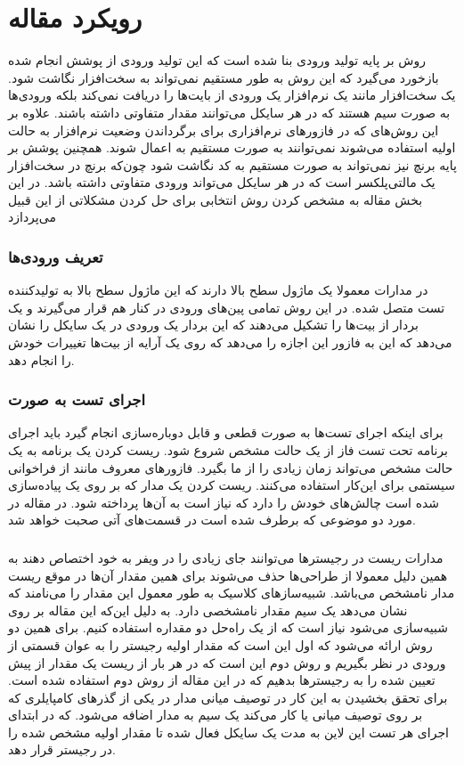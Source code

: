 \documentclass[conference]{IEEEtran}
\begin{document}
\section{رویکرد مقاله
}
روش
بر پایه تولید ورودی بنا شده است که این تولید ورودی از پوشش انجام شده بازخورد می‌گیرد که این
روش به طور مستقیم نمی‌تواند به سخت‌افزار نگاشت شود.
یک سخت‌افزار مانند یک نرم‌افزار یک ورودی از بایت‌ها را دریافت نمی‌کند بلکه ورودی‌ها به صورت
سیم هستند که در هر سایکل می‌توانند مقدار متفاوتی داشته باشند.
علاوه‌ بر این روش‌های
که در فازور‌های نرم‌افزاری برای برگرداندن وضعیت نرم‌افزار به حالت اولیه استفاده می‌شوند نمی‌توانند
به صورت مستقیم به
اعمال شوند.
همچنین پوشش بر پایه برنچ نیز نمی‌تواند به صورت مستقیم به کد
نگاشت شود چون‌که برنچ در سخت‌افزار یک مالتی‌پلکسر است که در هر سایکل می‌تواند
ورودی متفاوتی داشته باشد.
در این بخش مقاله
\cite{rf}
به مشخص کردن روش انتخابی برای حل کردن مشکلاتی از این قبیل می‌پردازد
\subsubsection{تعریف ورودی‌ها}
در مدارات
معمولا یک ماژول سطح بالا دارند که این ماژول سطح بالا به تولید‌کننده تست متصل شده.
در این روش تمامی پین‌های ورودی در کنار هم قرار می‌گیرند و یک بردار از بیت‌ها را تشکیل می‌دهند
که این بردار یک ورودی در یک سایکل را نشان می‌دهد که این به
فازور این اجازه را می‌دهد که روی یک آرایه‌ از بیت‌ها تغییرات خودش را انجام دهد.
\subsubsection{اجرای تست به صورت
}
برای اینکه اجرای تست‌ها به صورت قطعی و قابل دوباره‌سازی انجام گیرد باید اجرای برنامه تحت تست فاز
از یک حالت مشخص شروع شود.
ریست کردن یک برنامه به یک حالت مشخص می‌تواند زمان زیادی را از ما بگیرد.
فازور‌های معروف مانند
از فراخوانی سیستمی
برای این‌کار استفاده می‌کنند.
ریست کردن یک مدار
که بر روی یک
پیاده‌سازی شده است چالش‌های خودش را دارد که نیاز است به آن‌ها پرداخته شود.
در مقاله
\cite{rf}
در مورد دو موضوعی که برطرف شده است در قسمت‌های آتی صحبت خواهد شد.
\subsubsection{}
مدارات ریست در رجیستر‌ها می‌توانند جای زیادی را در ویفر به خود اختصاص دهند
به همین دلیل معمولا از طراحی‌ها حذف می‌شوند
برای همین مقدار آن‌ها در موقع ریست مدار نامشخص می‌باشد.
شبیه‌ساز‌های کلاسیک به طور معمول این مقدار را
می‌نامند که نشان می‌دهد یک سیم مقدار نامشخصی دارد.
به دلیل این‌که این مقاله بر روی
شبیه‌سازی می‌شود نیاز است که از یک راه‌حل دو مقداره استفاده کنیم.
برای همین دو روش ارائه می‌شود که اول این است که مقدار اولیه رجیستر را به عوان قسمتی از ورودی
در نظر بگیریم و روش دوم این است که در هر بار از ریست یک مقدار از پیش تعیین شده را به رجیستر‌ها
بدهیم که در این مقاله از روش دوم استفاده شده است.
برای تحقق بخشیدن به این کار در توصیف میانی مدار در یکی از گذر‌های کامپایلری که بر روی
توصیف میانی یا 
کار می‌کند یک سیم
به مدار اضافه می‌شود.
که در ابتدای اجرای هر تست این لاین به مدت یک سایکل فعال شده تا مقدار اولیه مشخص شده
را در رجیستر قرار دهد.
\end{document}
